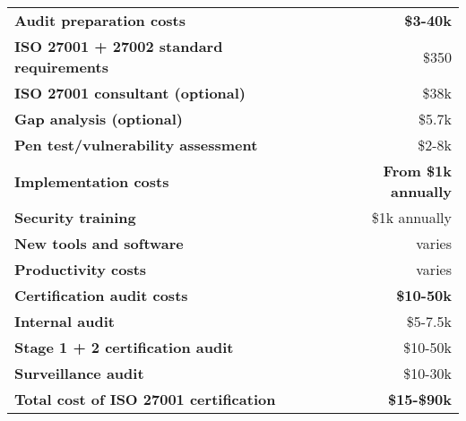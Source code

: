 \fancyheadoffset{0pt}%


\begin{table}[h!]
    \renewcommand*{\arraystretch}{1.4}
    \centering
    \begin{tabular}{>{\columncolor{blue}\color{white}\bfseries}lr}
        \rowcolor[gray]{0.8}
        \color{black} Audit preparation costs & \bfseries \$3-40k \\[2pt]
        ISO 27001 + 27002 standard requirements & \$350 \\
        ISO 27001 consultant (optional) & \$38k \\
        Gap analysis (optional) & \$5.7k \\
        Pen test/vulnerability assessment & \$2-8k \\
        \rowcolor[gray]{0.8}
        \color{black} Implementation costs & \bfseries From \$1k annually \\[2pt]
        Security training & \$1k annually \\
        New tools and software & varies \\
        Productivity costs & varies \\
        \rowcolor[gray]{0.8}
        \color{black} Certification audit costs & \bfseries \$10-50k \\[2pt]
        Internal audit & \$5-7.5k \\
        Stage 1 + 2 certification audit & \$10-50k \\
        Surveillance audit & \$10-30k \\
        \rowcolor[gray]{0.8}
        \color{black} \bfseries Total cost of ISO 27001 certification & \bfseries \$15-\$90k \\
    \end{tabular}
\end{table}

\restoregeometry
\fancyheadoffset{0pt}
